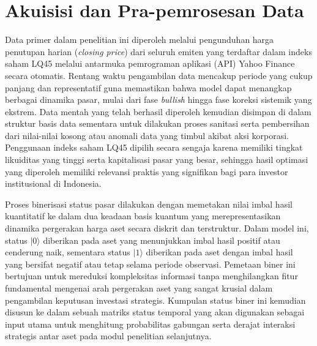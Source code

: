 \section{Akuisisi dan Pra-pemrosesan Data}
Data primer dalam penelitian ini diperoleh melalui pengunduhan harga penutupan harian (\textit{closing price}) dari seluruh emiten yang terdaftar dalam indeks saham LQ45 melalui antarmuka pemrograman aplikasi (API) Yahoo Finance secara otomatis. Rentang waktu pengambilan data mencakup periode yang cukup panjang dan representatif guna memastikan bahwa model dapat menangkap berbagai dinamika pasar, mulai dari fase \textit{bullish} hingga fase koreksi sistemik yang ekstrem. Data mentah yang telah berhasil diperoleh kemudian disimpan di dalam struktur basis data sementara untuk dilakukan proses sanitasi serta pembersihan dari nilai-nilai kosong atau anomali data yang timbul akibat aksi korporasi. Penggunaan indeks saham LQ45 dipilih secara sengaja karena memiliki tingkat likuiditas yang tinggi serta kapitalisasi pasar yang besar, sehingga hasil optimasi yang diperoleh memiliki relevansi praktis yang signifikan bagi para investor institusional di Indonesia.

Proses binerisasi status pasar dilakukan dengan memetakan nilai imbal hasil kuantitatif ke dalam dua keadaan basis kuantum yang merepresentasikan dinamika pergerakan harga aset secara diskrit dan terstruktur. Dalam model ini, status $|0\rangle$ diberikan pada aset yang menunjukkan imbal hasil positif atau cenderung naik, sementara status $|1\rangle$ diberikan pada aset dengan imbal hasil yang bersifat negatif atau tetap selama periode observasi. Pemetaan biner ini bertujuan untuk mereduksi kompleksitas informasi tanpa menghilangkan fitur fundamental mengenai arah pergerakan aset yang sangat krusial dalam pengambilan keputusan investasi strategis. Kumpulan status biner ini kemudian disusun ke dalam sebuah matriks status temporal yang akan digunakan sebagai input utama untuk menghitung probabilitas gabungan serta derajat interaksi strategis antar aset pada modul penelitian selanjutnya.
